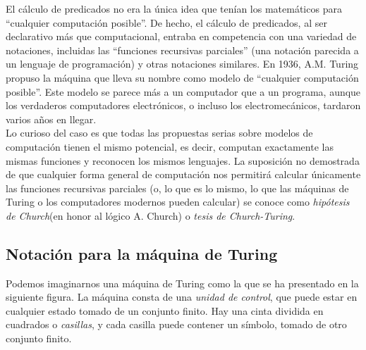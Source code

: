 El cálculo de predicados no era la única idea que tenían los matemáticos para ``cualquier computación posible''. De hecho, el cálculo de predicados, al ser declarativo más que computacional, entraba en competencia con una variedad de notaciones, incluidas las ``funciones recursivas parciales'' (una notación parecida a un lenguaje de programación) y otras notaciones similares. En 1936, A.M. Turing propuso la máquina que lleva su nombre como modelo de ``cualquier computación posible''. Este modelo se parece más a un computador que a un programa, aunque los verdaderos computadores electrónicos, o incluso los electromecánicos, tardaron varios años en llegar. \\

Lo curioso del caso es que todas las propuestas serias sobre modelos de computación tienen el mismo potencial, es decir, computan exactamente las mismas funciones y reconocen los mismos lenguajes. La suposición no demostrada de que cualquier forma general de computación nos permitirá calcular únicamente las funciones recursivas parciales (o, lo que es lo mismo, lo que las máquinas de Turing o los computadores modernos pueden calcular) se conoce como \emph{hipótesis de Church}(en honor al lógico A. Church) o \emph{tesis de Church-Turing}.\\

\subsection{Notación para la máquina de Turing}

Podemos imaginarnos una máquina de Turing como la que se ha presentado en la siguiente figura. La máquina consta de una \emph{unidad de control}, que puede estar en cualquier estado tomado de un conjunto finito. Hay una cinta dividida en cuadrados o \emph{casillas}, y cada casilla puede contener un símbolo, tomado de otro conjunto finito.\\

